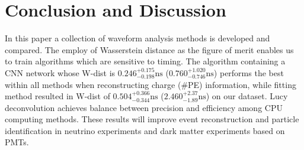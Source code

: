 \section{Conclusion and Discussion} %
In this paper a collection of waveform analysis methods is developed and compared. The employ of Wasserstein distance as the figure of merit enables us to train algorithms which are sensitive to timing. The algorithm containing a CNN network whose W-dist is $0.246^{+0.175}_{-0.198}\mathrm{ns}$ ($0.760^{+1.020}_{-0.746}\mathrm{ns}$) performs the best within all methods when reconstructing charge (\#PE) information, while fitting method resulted in W-dist of $0.504^{+0.366}_{-0.344}\mathrm{ns}$ ($2.460^{+2.37}_{-1.89}\mathrm{ns}$) on our dataset. Lucy deconvolution achieves balance between precision and efficiency among CPU computing methods. These results will improve event reconstruction and particle identification in neutrino experiments and dark matter experiments based on PMTs. 

